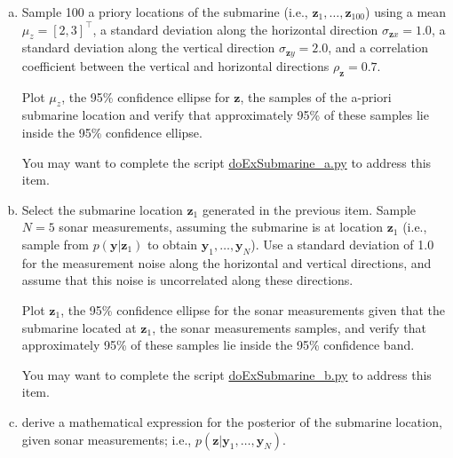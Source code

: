 \documentclass[12pt]{article}
\begin{document}
\begin{enumerate}[(a)]

    \item Sample 100 a priory locations of the submarine
        (i.e., $\mathbf{z}_1,\ldots,\mathbf{z}_{100}$) using
        a mean $\mu_z=[2,3]^\intercal$, a standard deviation along the
        horizontal direction $\sigma_{\mathbf{z}x}=1.0$, a standard
        deviation along the vertical direction $\sigma_{\mathbf{z}y}=2.0$,
        and a correlation coefficient between the vertical and horizontal
        directions $\rho_{\mathbf{z}}=0.7$.

        Plot $\mu_z$, the 95\% confidence ellipse for $\mathbf{z}$, the samples
        of the a-priori submarine location and verify that approximately 95\%
        of these samples lie inside the 95\% confidence ellipse.

        You may want to complete the script
        \href{https://github.com/joacorapela/gcnuBridging2023/blob/master/code/scripts/probability/unsupervisedInferenceInTheLinearGaussianModel/doExSubmarine_a.py}{doExSubmarine\_a.py}
        to address this item.

    \item Select the submarine location $\mathbf{z}_1$ generated in
        the previous item. Sample $N=5$ sonar measurements, assuming the
        submarine is at location $\mathbf{z}_1$ (i.e., sample from
        $p(\mathbf{y}|\mathbf{z}_1)$ to obtain
        $\mathbf{y}_1,\ldots,\mathbf{y}_N$). Use a standard deviation of
        1.0 for the measurement noise along the horizontal and vertical
        directions, and assume that this noise is uncorrelated along these
        directions.

        Plot $\mathbf{z}_1$, the 95\% confidence ellipse for the sonar
        measurements given that the submarine located at $\mathbf{z}_1$, the
        sonar measurements samples, and verify that approximately 95\% of these
        samples lie inside the 95\% confidence band.

        You may want to complete the script
        \href{https://github.com/joacorapela/gcnuBridging2023/blob/master/code/scripts/probability/unsupervisedInferenceInTheLinearGaussianModel/doExSubmarine_b.py}{doExSubmarine\_b.py}
        to address this item.

    \item derive a mathematical expression for the posterior of the
        submarine location, given sonar measurements; i.e.,
        $p(\mathbf{z}|\mathbf{y}_1,\ldots,\mathbf{y}_N)$.


\end{enumerate}
\end{document}
